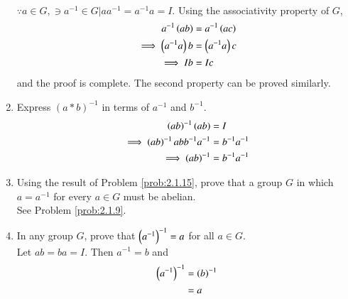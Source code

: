 \begin{enumerate}[label=\arabic*.,ref=\thesubsection.\theenumi]
	\\
	\solution $\because a \in G, \ni a^{-1} \in G | aa^{-1} = a^{-1}a = I$.  Using the associativity property of $G$,  
			\begin{align}
				a^{-1}\left(ab\right)
				&=
				a^{-1}\left(ac\right)
				\\
				\implies 
				\left(a^{-1}a\right)b
				&=
				\left(a^{-1}a\right)c
				\\
				\implies Ib &= Ic
			\end{align}
			and the proof is complete.  The second property can be proved similarly.
		\item Express $(a * b)^{-1}$ in terms of $a^{-1}$ and $b^{- 1}$.
			\label{prob:2.1.15}
			\\
			\solution 
			\begin{align}
				\left(ab\right)^{-1} (ab) &= I
				\\
				\implies \left(ab\right)^{-1} abb^{-1}a^{-1} &= b^{-1}a^{-1}
				\\
				\implies \left(ab\right)^{-1}  &= b^{-1}a^{-1}
			\end{align}
		\item Using the result of Problem 
			\ref{prob:2.1.15},
 prove that a group $G$ in which $a = a^{-1}$ for every $a \in  G$ must be abelian.
 \\
 \solution See Problem 
	\ref{prob:2.1.9}.
\item In any group $G$, prove that $\left(a^{-1}\right)^{-1} = a$ for all $a \in  G$.
	\\
	\solution Let $ab = ba = I$.  Then $a^{-1} = b $ and 
			\begin{align}
				\left(a^{-1}\right)^{-1} &= 
\left(b\right)^{-1} 
\\
				&= a
			\end{align}
\end{enumerate}
